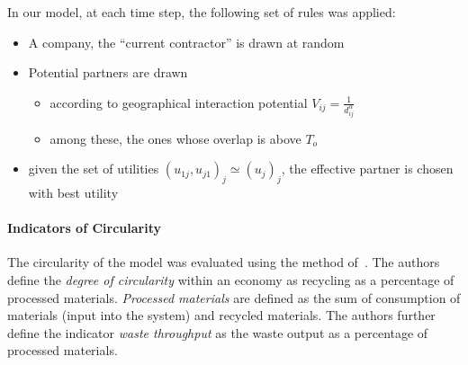 \documentclass{article}
\begin{document}
In our model, at each time step, the following set of rules was applied:
\begin{itemize}
\item A company, the ``current contractor'' is drawn at random %
\item Potential partners are drawn
\begin{itemize}
\item according to geographical interaction potential $V_{ij}=\frac{1}{d_{ij}^{\alpha}}$
\item among these, the ones whose overlap is above $T_o$
\end{itemize}
\item given the set of utilities $(u_{1j},u_{j1})_j \simeq (u_j)_j$, the effective partner is chosen with best utility
\end{itemize}




\paragraph{Indicators of Circularity}


The circularity of the model was evaluated using the method of~\cite{haas2015circular}. The authors define the \textit{degree of circularity} within an economy as recycling as a percentage of processed materials. \textit{Processed materials} are defined as the sum of consumption of materials (input into the system) and recycled materials. The authors further define the indicator \textit{waste throughput} as the waste output as a percentage of processed materials. 
\end{document}
